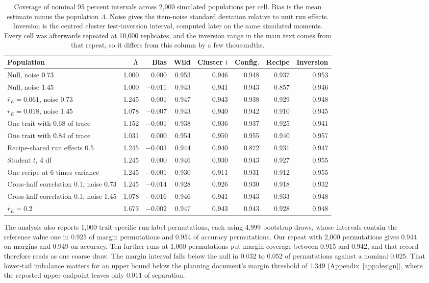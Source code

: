 \begin{table}[!htb]
\centering
\caption{Coverage of nominal 95 percent intervals across 2,000 simulated populations per cell. Bias is the mean estimate minus the population $\Lambda$. Noise gives the item-noise standard deviation relative to unit run effects. Inversion is the centred cluster test-inversion interval, computed later on the same simulated moments. Every cell was afterwards repeated at 10,000 replicates, and the inversion range in the main text comes from that repeat, so it differs from this column by a few thousandths.}
\label{tab:coverage}
\small\setlength{\tabcolsep}{4pt}\renewcommand{\arraystretch}{1.1}
\begin{tabular}{lrrrrrrr}
\toprule
Population & $\Lambda$ & Bias & Wild & Cluster $t$ & Config. & Recipe & Inversion\\
\midrule
Null, noise 0.73 & 1.000 & 0.000 & 0.953 & 0.946 & 0.948 & 0.937 & 0.953\\
Null, noise 1.45 & 1.000 & $-0.011$ & 0.943 & 0.941 & 0.943 & 0.857 & 0.946\\
$\bar r_E=0.061$, noise 0.73 & 1.245 & 0.001 & 0.947 & 0.943 & 0.938 & 0.929 & 0.948\\
$\bar r_E=0.018$, noise 1.45 & 1.078 & $-0.007$ & 0.943 & 0.940 & 0.942 & 0.910 & 0.945\\
One trait with 0.68 of trace & 1.152 & $-0.001$ & 0.938 & 0.936 & 0.937 & 0.925 & 0.941\\
One trait with 0.84 of trace & 1.031 & 0.000 & 0.954 & 0.950 & 0.955 & 0.940 & 0.957\\
Recipe-shared run effects 0.5 & 1.245 & $-0.003$ & 0.944 & 0.940 & 0.872 & 0.931 & 0.947\\
Student $t$, 4 df & 1.245 & 0.000 & 0.946 & 0.930 & 0.943 & 0.927 & 0.955\\
One recipe at 6 times variance & 1.245 & $-0.001$ & 0.930 & 0.911 & 0.931 & 0.912 & 0.955\\
Cross-half correlation 0.1, noise 0.73 & 1.245 & $-0.014$ & 0.928 & 0.926 & 0.930 & 0.918 & 0.932\\
Cross-half correlation 0.1, noise 1.45 & 1.078 & $-0.016$ & 0.946 & 0.941 & 0.943 & 0.933 & 0.948\\
$\bar r_E=0.2$ & 1.673 & $-0.002$ & 0.947 & 0.943 & 0.943 & 0.928 & 0.948\\
\bottomrule
\end{tabular}
\end{table}

The analysis also reports 1,000 trait-specific run-label permutations, each using 4,999 bootstrap draws, whose intervals contain the reference value one in 0.925 of margin permutations and 0.954 of accuracy permutations. Our repeat with 2,000 permutations gives 0.944 on margins and 0.949 on accuracy. Ten further runs at 1,000 permutations put margin coverage between 0.915 and 0.942, and that record therefore reads as one coarse draw. The margin interval falls below the null in 0.032 to 0.052 of permutations against a nominal 0.025. That lower-tail imbalance matters for an upper bound below the planning document's margin threshold of 1.349 (Appendix~\ref{app:design}), where the reported upper endpoint leaves only 0.011 of separation.

